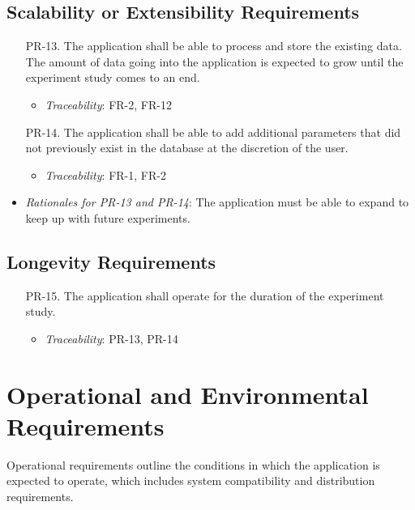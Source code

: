 \documentclass[12pt]{article}
\begin{document}
\subsection{Scalability or Extensibility Requirements}
\begin{enumerate}
  \item[PR-13.] The application shall be able to process and store the existing data. The amount of data going into the application is expected to grow until the experiment study comes to an end.
    \begin{itemize}
      \item \textit{Traceability}: FR-2, FR-12
    \end{itemize}
  \item[PR-14.] The application shall be able to add additional parameters that did not previously exist in the database at the discretion of the user.
    \begin{itemize}
      \item \textit{Traceability}: FR-1, FR-2
    \end{itemize}
\end{enumerate}
\begin{itemize}
  \item \textit{Rationales for PR-13 and PR-14}: The application must be able to expand to keep up with future experiments.
\end{itemize}

\subsection{Longevity Requirements}
\begin{enumerate}
  \item[PR-15.] The application shall operate for the duration of the experiment study.
  \begin{itemize}
    \item \textit{Traceability}: PR-13, PR-14
  \end{itemize}
\end{enumerate}

\section{Operational and Environmental Requirements}
Operational requirements outline the conditions in which the application is expected to operate, which includes system compatibility and distribution requirements.
\end{document}
